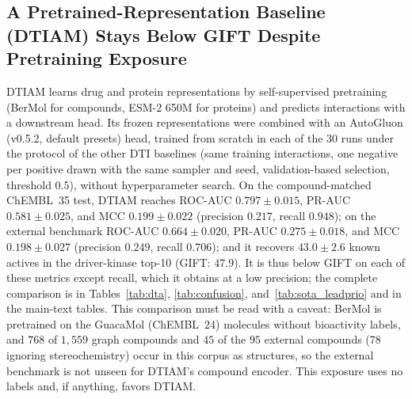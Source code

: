 \documentclass[11pt,letterpaper]{article}
\begin{document}
\subsection{A Pretrained-Representation Baseline (DTIAM) Stays Below GIFT Despite Pretraining Exposure}
\label{sec:dtiam}
DTIAM \cite{lu2025dtiam} learns drug and protein representations by self-supervised pretraining (BerMol for compounds, ESM-2 650M for proteins) and predicts interactions with a downstream head. Its frozen representations were combined with an AutoGluon (v0.5.2, default presets) head, trained from scratch in each of the 30 runs under the protocol of the other DTI baselines (same training interactions, one negative per positive drawn with the same sampler and seed, validation-based selection, threshold $0.5$), without hyperparameter search. On the compound-matched ChEMBL~35 test, DTIAM reaches ROC-AUC $0.797\pm0.015$, PR-AUC $0.581\pm0.025$, and MCC $0.199\pm0.022$ (precision $0.217$, recall $0.948$); on the external benchmark ROC-AUC $0.664\pm0.020$, PR-AUC $0.275\pm0.018$, and MCC $0.198\pm0.027$ (precision $0.249$, recall $0.706$); and it recovers $43.0\pm2.6$ known actives in the driver-kinase top-10 (GIFT: $47.9$). It is thus below GIFT on each of these metrics except recall, which it obtains at a low precision; the complete comparison is in Tables~\ref{tab:dta}, \ref{tab:confusion}, and~\ref{tab:sota_leadprio} and in the main-text tables. This comparison must be read with a caveat: BerMol is pretrained on the GuacaMol (ChEMBL~24) molecules without bioactivity labels, and $768$ of $1{,}559$ graph compounds and $45$ of the $95$ external compounds ($78$ ignoring stereochemistry) occur in this corpus as structures, so the external benchmark is not unseen for DTIAM's compound encoder. This exposure uses no labels and, if anything, favors DTIAM.

\FloatBarrier


\end{document}
